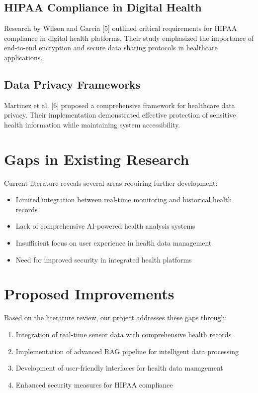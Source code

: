\subsection{HIPAA Compliance in Digital Health}
Research by Wilson and Garcia [5] outlined critical requirements for HIPAA compliance in digital health platforms. Their study emphasized the importance of end-to-end encryption and secure data sharing protocols in healthcare applications.

\subsection{Data Privacy Frameworks}
Martinez et al. [6] proposed a comprehensive framework for healthcare data privacy. Their implementation demonstrated effective protection of sensitive health information while maintaining system accessibility.

\section{Gaps in Existing Research}
Current literature reveals several areas requiring further development:

\begin{itemize}
    \item Limited integration between real-time monitoring and historical health records
    \item Lack of comprehensive AI-powered health analysis systems
    \item Insufficient focus on user experience in health data management
    \item Need for improved security in integrated health platforms
\end{itemize}

\section{Proposed Improvements}
Based on the literature review, our project addresses these gaps through:

\begin{enumerate}
    \item Integration of real-time sensor data with comprehensive health records
    \item Implementation of advanced RAG pipeline for intelligent data processing
    \item Development of user-friendly interfaces for health data management
    \item Enhanced security measures for HIPAA compliance
\end{enumerate} 